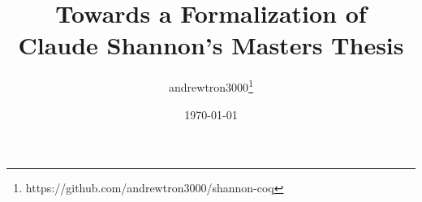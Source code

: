 \documentclass[11pt,twocolumn]{article}
\title{Towards a Formalization of \\ Claude Shannon's Masters Thesis}
\author{andrewtron3000\thanks{https://github.com/andrewtron3000/shannon-coq}}
\date{\today}
\begin{document}
\maketitle
\begin{abstract}

\end{abstract}
\end{document}
